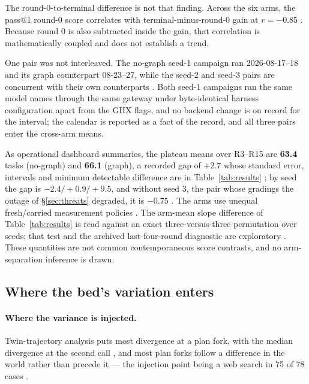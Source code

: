 The round-0-to-terminal difference is not that finding. Across the six arms, the pass@1 round-0 score correlates with
terminal-minus-round-0 gain at $r=-0.85$ . Because round 0 is also subtracted inside the gain, that
correlation is mathematically coupled and does not establish a trend.

One pair was not interleaved. The no-graph seed-1 campaign ran
2026-08-17--18 and its graph counterpart 08-23--27, while the seed-2 and
seed-3 pairs are concurrent with their own counterparts . Both
seed-1 campaigns ran the same model names through the same gateway under
byte-identical harness configuration apart from the GHX flags, and no
backend change is on record for the interval; the calendar is reported
as a fact of the record, and all three pairs enter the cross-arm means.

As operational dashboard summaries, the plateau means over R3--R15 are
\textbf{63.4} tasks (no-graph) and \textbf{66.1} (graph), a recorded gap of
$+2.7$ whose standard error, intervals and minimum detectable difference
are in Table~\ref{tab:results} ; by seed the gap is $-2.4/+0.9/+9.5$,
and without seed 3, the pair whose gradings the outage of
\S\ref{sec:threats} degraded, it is $-0.75$ . The arms use
unequal fresh/carried measurement policies . The arm-mean slope difference of
Table~\ref{tab:results} is read against an exact three-versus-three
permutation over seeds; that test and the archived last-four-round
diagnostic are exploratory . These quantities are not common contemporaneous score
contrasts, and no arm-separation inference is drawn.



\subsection{Where the bed's variation enters}
\label{sec:respace}



\paragraph{Where the variance is injected.} Twin-trajectory analysis puts
most divergence at a plan fork, with the median divergence at the second
call , and most plan forks follow a difference in the world rather
than precede it --- the injection point being a web search in 75 of 78
cases . 

